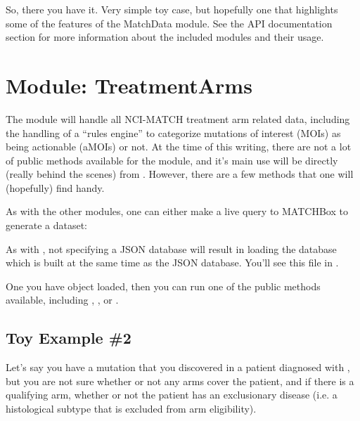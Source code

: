 \documentclass[letterpaper,10pt,english]{sphinxmanual}
\begin{document}
So, there you have it.  Very simple toy case, but hopefully one that highlights
some of the features of the MatchData module.  See the API documentation section
for more information about the included modules and their usage.


\section{Module: TreatmentArms}
\label{\detokenize{tutorial:module-treatmentarms}}
The  module will handle all NCI-MATCH treatment arm related data,
including the handling of a “rules engine” to categorize mutations of interest
(MOIs) as being actionable (aMOIs) or not.  At the time of this writing, there are
not a lot of public methods available for the module, and it’s main use will be
directly (really behind the scenes) from .  However, there are a few
methods that one will (hopefully) find handy.

As with the other modules, one can either make a live query to MATCHBox to generate
a dataset:

%
\begin{sphinxVerbatim}[commandchars=\\\{\}]
   
  
\end{sphinxVerbatim}

As with , not specifying a JSON database will result in loading the
 database which is built at the same time as the  JSON
database.  You’ll see this file in .

One you have object loaded, then you can run one of the public methods available,
including , , or .


\subsection{Toy Example \#2}
\label{\detokenize{tutorial:toy-example-2}}
Let’s say you have a  mutation that you discovered in a patient
diagnosed with  , but you are not sure whether or not any arms cover the
patient, and if there is a qualifying arm, whether or not the patient has an
exclusionary disease (i.e. a histological subtype that is excluded from arm
eligibility).
\end{document}
